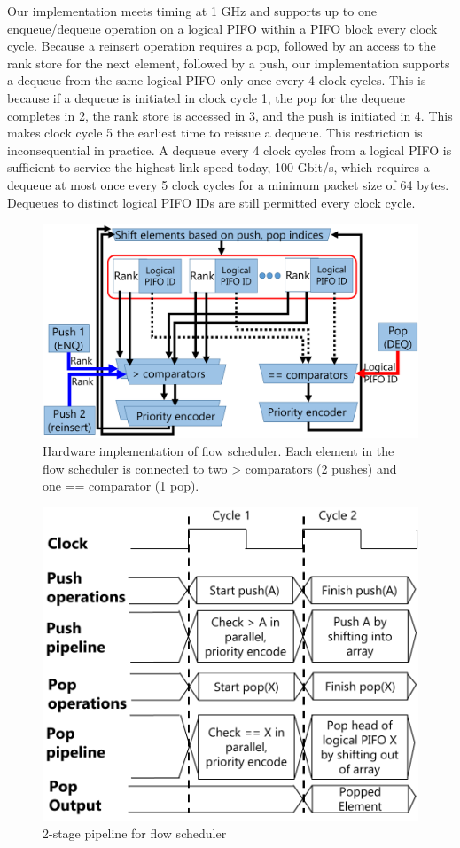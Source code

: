Our implementation meets timing at 1 GHz and supports up to one enqueue/dequeue
operation on a logical PIFO within a PIFO block every clock cycle. Because a reinsert
operation requires a pop, followed by an access to the rank store for the next
element, followed by a push, our implementation supports a dequeue from the
same logical PIFO only once every 4 clock cycles. This is because if a dequeue is
initiated in clock cycle 1, the pop for the dequeue completes in 2, the rank
store is accessed in 3, and the push is initiated in 4. This makes clock cycle 5 the
earliest time to reissue a dequeue.  This restriction is inconsequential in
practice.  A dequeue every 4 clock cycles from a logical PIFO is sufficient to
service the highest link speed today, 100 Gbit/s, which requires a dequeue at
most once every 5 clock cycles for a minimum packet size of 64 bytes. Dequeues
to distinct logical PIFO IDs are still permitted every clock cycle.

\begin{figure}[!t]
  \centering
  \includegraphics[width=0.6\columnwidth]{pifo_flow_scheduler_hardware.pdf}
  \caption{Hardware implementation of flow scheduler. Each element in the flow
  scheduler is connected to two > comparators (2 pushes) and one == comparator (1
  pop).}
  \label{fig:flow_scheduler}
\end{figure}

\begin{figure}[!t]
  \centering
  \includegraphics[width=0.6\columnwidth]{pifo_2stage_pipeline.pdf}
  \caption{2-stage pipeline for flow scheduler}
  \label{fig:2stage}
\end{figure}

